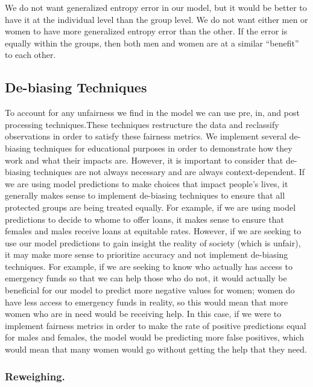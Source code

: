 \documentclass[water,article,submit,moreauthors,pdftex]{mdpi}
\begin{document}
We do not want generalized entropy error in our model, but it would be
better to have it at the individual level than the group level. We do
not want either men or women to have more generalized entropy error than
the other. If the error is equally within the groups, then both men and
women are at a similar ``benefit'' to each other.

\hypertarget{de-biasing-techniques}{%
\subsection{De-biasing Techniques}\label{de-biasing-techniques}}

To account for any unfairness we find in the model we can use pre, in,
and post processing techniques.These techniques restructure the data and
reclassify observations in order to satisfy these fairness metrics. We
implement several de-biasing techniques for educational purposes in
order to demonstrate how they work and what their impacts are. However,
it is important to consider that de-biasing techniques are not always
necessary and are always context-dependent. If we are using model
predictions to make choices that impact people's lives, it generally
makes sense to implement de-biasing techniques to ensure that all
protected groups are being treated equally. For example, if we are using
model predictions to decide to whome to offer loans, it makes sense to
ensure that females and males receive loans at equitable rates. However,
if we are seeking to use our model predictions to gain insight the
reality of society (which is unfair), it may make more sense to
prioritize accuracy and not implement de-biasing techniques. For
example, if we are seeking to know who actually has access to emergency
funds so that we can help those who do not, it would actually be
beneficial for our model to predict more negative values for women;
women do have less access to emergency funds in reality, so this would
mean that more women who are in need would be receiving help. In this
case, if we were to implement fairness metrics in order to make the rate
of positive predictions equal for males and females, the model would be
predicting more false positives, which would mean that many women would
go without getting the help that they need.

\hypertarget{reweighing.}{%
\subsubsection{Reweighing.}\label{reweighing.}}
\end{document}
